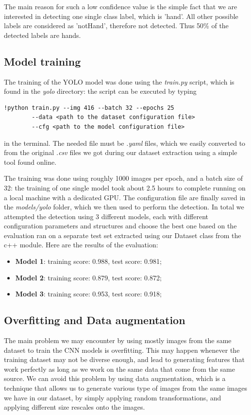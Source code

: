 The main reason for such a low confidence value is the simple fact that we are interested in detecting one single class label, which is 'hand'. All other possible labels are considered as 
'notHand', therefore not detected. Thus 50\% of the detected labels are hands.

\subsection{Model training}
The training of the YOLO model was done using the \textit{train.py} script, which is found in the \textit{yolo} directory: the script 
can be executed by typing
\begin{lstlisting}[]
    !python train.py --img 416 --batch 32 --epochs 25 
        --data <path to the dataset configuration file> 
        --cfg <path to the model configuration file>
\end{lstlisting} 

in the terminal. The needed file must be \textit{.yaml} files, which we easily converted to from the original \textit{.csv} files 
we got during our dataset extraction using a simple tool found online. 

The training was done using roughly 1000 images per epoch, and a batch size of 32: the training of one single model took about 2.5 hours to complete
running on a local machine with a dedicated GPU. The configuration file are finally saved in the \textit{models/yolo} folder, which we then used 
to perform the detection. In total we attempted the detection using 3 different models, each with different configuration parameters and structures 
and choose the best one based on the evaluation ran on a separate test set extracted using our Dataset class from the c++ module.
Here are the results of the evaluation:
\begin{itemize}
    \item \textbf{Model 1}: training score: 0.988, test score: 0.981;
    \item \textbf{Model 2}: training score: 0.879, test score: 0.872;
    \item \textbf{Model 3}: training score: 0.953, test score: 0.918; 
\end{itemize}

\subsection{Overfitting and Data augmentation}
The main problem we may encounter by using mostly images from the same dataset to train the CNN models is overfitting. This may happen whenever
the training dataset may not be diverse enough, and lead to generating features that work perfectly as long as we work on the same data that come from 
the same source. We can avoid this problem by using data augmentation, which is a technique that allows us to generate various type of images from the 
same images we have in our dataset, by simply applying random transformations, and applying different size rescales onto the images.

